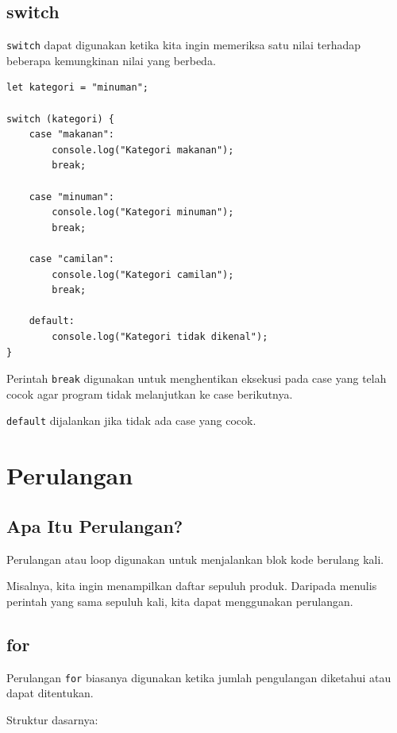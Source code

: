 \documentclass[12pt,a4paper]{article}
\begin{document}
\subsection{switch}

\texttt{switch} dapat digunakan ketika kita ingin
memeriksa satu nilai terhadap beberapa kemungkinan
nilai yang berbeda.

\begin{lstlisting}
let kategori = "minuman";

switch (kategori) {
    case "makanan":
        console.log("Kategori makanan");
        break;

    case "minuman":
        console.log("Kategori minuman");
        break;

    case "camilan":
        console.log("Kategori camilan");
        break;

    default:
        console.log("Kategori tidak dikenal");
}
\end{lstlisting}

Perintah \texttt{break} digunakan untuk menghentikan
eksekusi pada case yang telah cocok agar program
tidak melanjutkan ke case berikutnya.

\texttt{default} dijalankan jika tidak ada case
yang cocok.

\section{Perulangan}

\subsection{Apa Itu Perulangan?}

Perulangan atau loop digunakan untuk menjalankan
blok kode berulang kali.

Misalnya, kita ingin menampilkan daftar sepuluh
produk. Daripada menulis perintah yang sama
sepuluh kali, kita dapat menggunakan perulangan.

\subsection{for}

Perulangan \texttt{for} biasanya digunakan ketika
jumlah pengulangan diketahui atau dapat ditentukan.

Struktur dasarnya:
\end{document}
